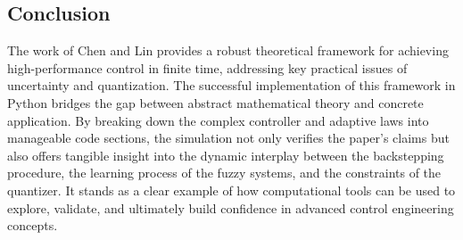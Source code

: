 \FloatBarrier
\subsection{Conclusion}
The work of Chen and Lin provides a robust theoretical framework for achieving high-performance control in finite time, addressing key practical issues of uncertainty and quantization. The successful implementation of this framework in Python bridges the gap between abstract mathematical theory and concrete application. By breaking down the complex controller and adaptive laws into manageable code sections, the simulation not only verifies the paper's claims but also offers tangible insight into the dynamic interplay between the backstepping procedure, the learning process of the fuzzy systems, and the constraints of the quantizer. It stands as a clear example of how computational tools can be used to explore, validate, and ultimately build confidence in advanced control engineering concepts.

